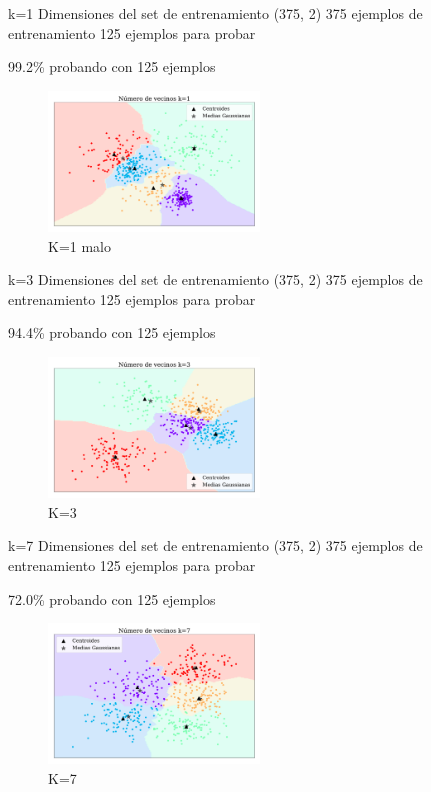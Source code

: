 k=1
Dimensiones del set de entrenamiento  (375, 2)
375 ejemplos de entrenamiento
125 ejemplos para probar

99.2\% probando con 125 ejemplos

\begin{figure}[H]
    \centering
    \includegraphics[width=0.5\textwidth]{plots/ejer_4_K-1_si_converge.pdf}
    \caption{K=1 malo}
    \label{fig:ejer4_k_1}
\end{figure} 


k=3
Dimensiones del set de entrenamiento  (375, 2)
375 ejemplos de entrenamiento
125 ejemplos para probar

94.4\% probando con 125 ejemplos

\begin{figure}[H]
    \centering
    \includegraphics[width=0.5\textwidth]{plots/ejer_4_K-3_si_converge.pdf}
    \caption{K=3 }
    \label{fig:ejer4_k_3}
\end{figure} 

k=7
Dimensiones del set de entrenamiento  (375, 2)
375 ejemplos de entrenamiento
125 ejemplos para probar

72.0\% probando con 125 ejemplos
\begin{figure}[H]
    \centering
    \includegraphics[width=0.5\textwidth]{plots/ejer_4_K-7_si_converge.pdf}
    \caption{K=7 }
    \label{fig:ejer4_k_7}
\end{figure} 


